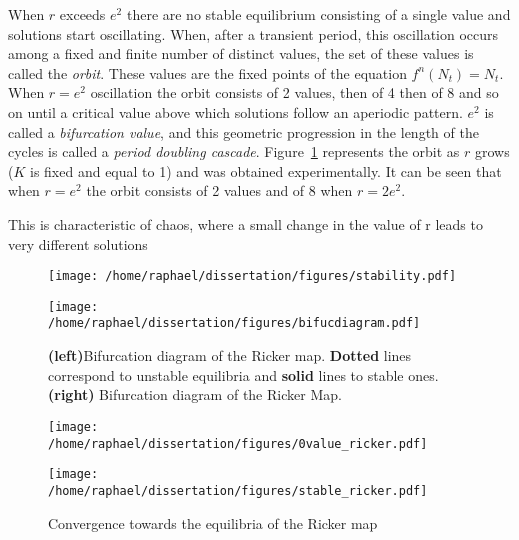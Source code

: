 \documentclass{report}
\begin{document}
	When $r$ exceeds $e^2$ there are no stable equilibrium consisting of a single value and solutions start oscillating. When, after a transient period, this oscillation occurs among a fixed and finite number of distinct values, the set of these values is called the \emph{orbit}. These values are the fixed points of the equation $f^n(N_t) = N_t$. When $r=e^2$ oscillation the orbit consists of 2 values, then of 4 then of 8 and so on until a critical value above which solutions follow an aperiodic pattern. $e^2$ is called a \emph{bifurcation value}, and this geometric progression in the length of the cycles is called a \emph{period doubling cascade}. Figure~\ref{fig:stability} represents the orbit as $r$ grows ($K$ is fixed and equal to 1) and was obtained experimentally. It can be seen that when $r=e^2$ the orbit consists of 2 values and of 8 when $r=2e^2$.
	
	This is characteristic of chaos, where a small change in the value of r leads to very different solutions	
	
\begin{figure}[htb]
	\centering
	\begin{minipage}{0.4\textwidth}
		\centering
		\texttt{[image: /home/raphael/dissertation/figures/stability.pdf]}
	\end{minipage}
	\begin{minipage}{0.4\textwidth}
		\centering
		\texttt{[image: /home/raphael/dissertation/figures/bifucdiagram.pdf]}
	\end{minipage}
	\caption{\textbf{(left)}Bifurcation diagram of the Ricker map. \textbf{Dotted} lines correspond to unstable equilibria and \textbf{solid} lines to stable ones. \textbf{(right)} Bifurcation diagram of the Ricker Map.}
	\label{fig:stability}
\end{figure}

\begin{figure}[htb]
	\centering
	\begin{minipage}{0.4\textwidth}
		\centering
		\texttt{[image: /home/raphael/dissertation/figures/0value\_ricker.pdf]}
	\end{minipage}
	\begin{minipage}{0.4\textwidth}
		\centering
		\texttt{[image: /home/raphael/dissertation/figures/stable\_ricker.pdf]}
	\end{minipage}
	\caption{Convergence towards the equilibria of the Ricker map}
	\label{fig:stab}
\end{figure}
	
	
	{}
\end{document}
